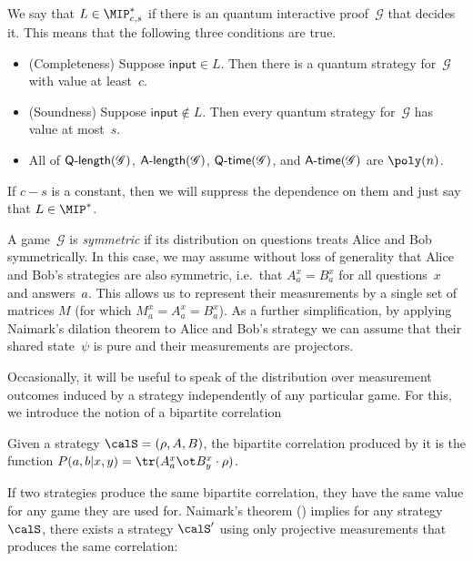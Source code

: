 \documentclass[11pt]{article}
\newcommand{\game}{\mathscr{G}}
\newcommand{\qtime}[1]{\mathsf{Q}\textnormal{-}\mathsf{time}(#1)}
\newcommand{\atime}[1]{\mathsf{A}\textnormal{-}\mathsf{time}(#1)}
\newcommand{\qlength}[1]{\mathsf{Q}\textnormal{-}\mathsf{length}(#1)}
\newcommand{\alength}[1]{\mathsf{A}\textnormal{-}\mathsf{length}(#1)}
\begin{document}
\begin{definition}
We say that $L \in \MIP_{c, s}^*$ if there is an quantum interactive proof~$\game$ that decides it.
This means that the following three conditions are true.
\begin{itemize}
\item[$\circ$] (Completeness) Suppose $\mathsf{input} \in L$.  Then there is a quantum strategy for~$\game$ with value at least~$c$.
\item[$\circ$] (Soundness) Suppose $\mathsf{input} \notin L$.  Then every quantum strategy for~$\game$ has value at most~$s$.
\item[$\circ$] All of $\qlength{\game}$, $\alength{\game}$, $\qtime{\game}$, and $\atime{\game}$ are $\poly(n)$.
\end{itemize}
If $c - s$ is a constant, then we will suppress the dependence on them and just say that $L \in \MIP^*$.
\end{definition}

\begin{remark}
A game~$\game$ is \emph{symmetric} if its distribution on questions treats Alice and Bob symmetrically.
In this case, we may assume without loss of generality that Alice and Bob's strategies are also symmetric,
i.e.\ that $A_a^x = B_a^x$ for all questions~$x$ and answers~$a$.
This allows us to represent their measurements by a single set of matrices $M$ (for which $M_a^x = A_a^x = B_a^x$).
As a further simplification, by applying Naimark's dilation theorem to Alice and Bob's strategy 
we can assume that their shared state~$\psi$ is pure and their measurements are projectors.
\end{remark}

Occasionally, it will be useful to speak of the distribution over
measurement outcomes induced by a strategy independently of any
particular game. For this, we introduce the notion of a bipartite correlation
\begin{definition}
  Given a strategy $\calS = (\rho, A, B)$, the bipartite correlation produced by it is
  the function $P(a, b | x, y) = \tr(A^x_a \ot B^x_y \cdot \rho)$.
\end{definition}
If two strategies produce the same bipartite correlation, they have
the same value for any game they are used for. Naimark's theorem
() implies for any strategy $\calS$, there exists a
strategy $\calS'$ using only projective measurements that produces the
same correlation:
\end{document}
